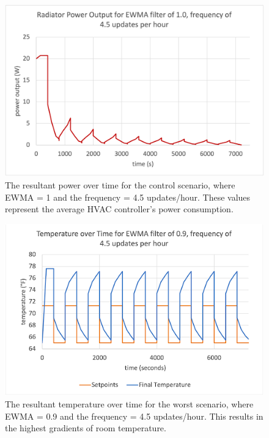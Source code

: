 \documentclass[conference,letterpaper]{IEEEtran}
\begin{document}
\begin{figure}[H]
    \includegraphics[scale=0.48]{powercontrol.png}
    \caption{The resultant power over time for the control scenario, where EWMA = 1 and the frequency = 4.5 updates/hour. These values represent the average HVAC controller's power consumption.}
\end{figure}
\begin{figure}[H]
    \includegraphics[scale=0.48]{tempworst.png}
    \caption{The resultant temperature over time for the worst scenario, where EWMA = 0.9 and the frequency = 4.5 updates/hour. This results in the highest gradients of room temperature.}
\end{figure}
\end{document}

